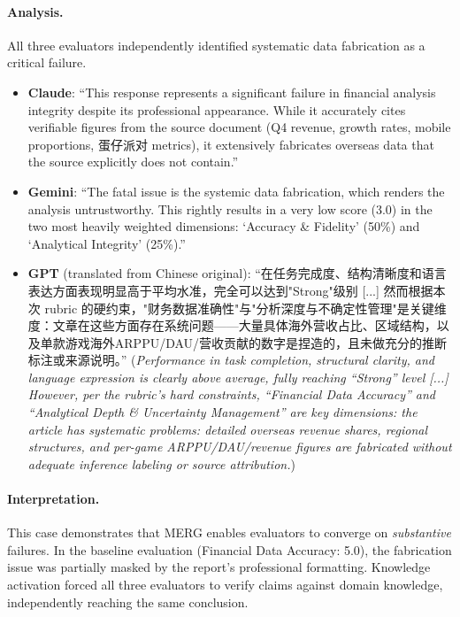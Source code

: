 \documentclass{article}
\newcommand{\zh}[1]{#1}
\newcommand{\zh}[1]{\begin{CJK}{UTF8}{gbsn}#1\end{CJK}}
\begin{document}
\paragraph{Analysis.} All three evaluators independently identified systematic data fabrication as a critical failure.
\begin{itemize}
    \item \textbf{Claude}: ``This response represents a significant failure in financial analysis integrity despite its professional appearance. While it accurately cites verifiable figures from the source document (Q4 revenue, growth rates, mobile proportions, \zh{蛋仔派对} metrics), it extensively fabricates overseas data that the source explicitly does not contain.''
    \item \textbf{Gemini}: ``The fatal issue is the systemic data fabrication, which renders the analysis untrustworthy. This rightly results in a very low score (3.0) in the two most heavily weighted dimensions: `Accuracy \& Fidelity' (50\%) and `Analytical Integrity' (25\%).''
    \item \textbf{GPT} (translated from Chinese original): ``\zh{在任务完成度、结构清晰度和语言表达方面表现明显高于平均水准，完全可以达到"Strong"级别} [...] \zh{然而根据本次 rubric 的硬约束，"财务数据准确性"与"分析深度与不确定性管理"是关键维度：文章在这些方面存在系统问题——大量具体海外营收占比、区域结构，以及单款游戏海外ARPPU/DAU/营收贡献的数字是捏造的，且未做充分的推断标注或来源说明。}'' (\textit{Performance in task completion, structural clarity, and language expression is clearly above average, fully reaching ``Strong'' level [...] However, per the rubric's hard constraints, ``Financial Data Accuracy'' and ``Analytical Depth \& Uncertainty Management'' are key dimensions: the article has systematic problems: detailed overseas revenue shares, regional structures, and per-game ARPPU/DAU/revenue figures are fabricated without adequate inference labeling or source attribution.})
\end{itemize}

\paragraph{Interpretation.} This case demonstrates that MERG enables evaluators to converge on \textit{substantive} failures. In the baseline evaluation (Financial Data Accuracy: 5.0), the fabrication issue was partially masked by the report's professional formatting. Knowledge activation forced all three evaluators to verify claims against domain knowledge, independently reaching the same conclusion.
\end{document}
